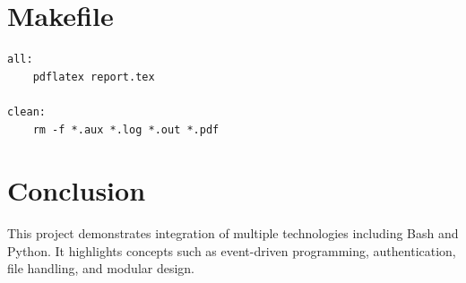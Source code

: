 \documentclass[12pt]{article}
\begin{document}
\section{Makefile}

\begin{verbatim}
all:
	pdflatex report.tex

clean:
	rm -f *.aux *.log *.out *.pdf
\end{verbatim}

\section{Conclusion}

This project demonstrates integration of multiple technologies including Bash and Python. It highlights concepts such as event-driven programming, authentication, file handling, and modular design.
\end{document}
